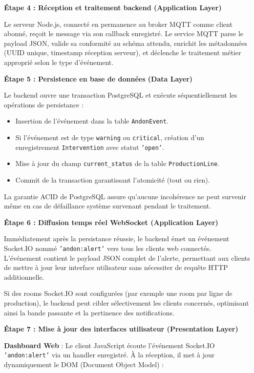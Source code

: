 \textbf{Étape 4 : Réception et traitement backend (Application Layer)}

Le serveur Node.js, connecté en permanence au broker MQTT comme client abonné, reçoit le message via son callback enregistré. Le service MQTT parse le payload JSON, valide sa conformité au schéma attendu, enrichit les métadonnées (UUID unique, timestamp réception serveur), et déclenche le traitement métier approprié selon le type d'événement.

\textbf{Étape 5 : Persistence en base de données (Data Layer)}

Le backend ouvre une transaction PostgreSQL et exécute séquentiellement les opérations de persistance :

\begin{itemize}
    \item Insertion de l'événement dans la table \texttt{AndonEvent}.
    \item Si l'événement est de type \texttt{warning} ou \texttt{critical}, création d'un enregistrement \texttt{Intervention} avec statut \texttt{'open'}.
    \item Mise à jour du champ \texttt{current\_status} de la table \texttt{ProductionLine}.
    \item Commit de la transaction garantissant l'atomicité (tout ou rien).
\end{itemize}

La garantie ACID de PostgreSQL assure qu'aucune incohérence ne peut survenir même en cas de défaillance système survenant pendant le traitement.

\textbf{Étape 6 : Diffusion temps réel WebSocket (Application Layer)}

Immédiatement après la persistance réussie, le backend émet un événement Socket.IO nommé \texttt{'andon:alert'} vers tous les clients web connectés. L'événement contient le payload JSON complet de l'alerte, permettant aux clients de mettre à jour leur interface utilisateur sans nécessiter de requête HTTP additionnelle.

Si des rooms Socket.IO sont configurées (par exemple une room par ligne de production), le backend peut cibler sélectivement les clients concernés, optimisant ainsi la bande passante et la pertinence des notifications.

\textbf{Étape 7 : Mise à jour des interfaces utilisateur (Presentation Layer)}

\textbf{Dashboard Web} : Le client JavaScript écoute l'événement Socket.IO \texttt{'andon:alert'} via un handler enregistré. À la réception, il met à jour dynamiquement le DOM (Document Object Model) :

